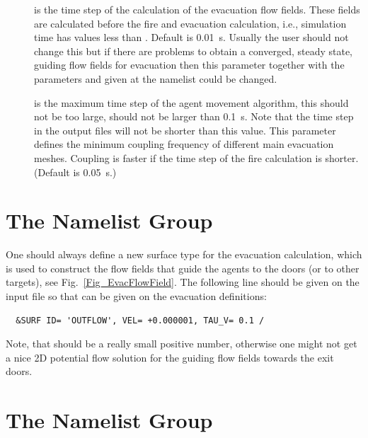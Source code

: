 \documentclass[12pt,a4paper,final,twoside]{stylevk}
\begin{document}
\begin{description}
%
\item[] is the time step of the calculation
  of the evacuation flow fields.  These fields are calculated before
  the fire and evacuation calculation, i.e., simulation time
  has values less than .  Default is 0.01~s.  Usually
  the user should not change this but if there are problems to obtain
  a converged, steady state, guiding flow fields for evacuation then
  this parameter together with the parameters
   and
   given at the 
  namelist could be changed.
%
\item[] is the maximum time step of the
  agent movement algorithm, this should not be too large, should not
  be larger than 0.1~s.  Note that the time step in the output files
  will not be shorter than this value.  This parameter defines the
  minimum coupling frequency of different main evacuation meshes.
  Coupling is faster if the time step of the fire calculation is
  shorter. (Default is 0.05~s.)
%
\end{description}



\section{The  Namelist Group}\label{Sec_SurfNML}

\noindent One should always define a new surface type for the evacuation
calculation, which is used to construct the flow fields that guide the
agents to the doors (or to other targets), see
Fig.~\ref{Fig_EvacFlowField}.  The following line should be given on
the input file so that  can be given on the
evacuation  definitions:
\begin{verbatim}
  &SURF ID= 'OUTFLOW', VEL= +0.000001, TAU_V= 0.1 /  
\end{verbatim}
%
Note, that  should be a really small positive number,
otherwise one might not get a nice 2D potential flow solution for the
guiding flow fields towards the exit doors.


\section{The  Namelist Group}\label{Sec_MiscNML}
\end{document}
